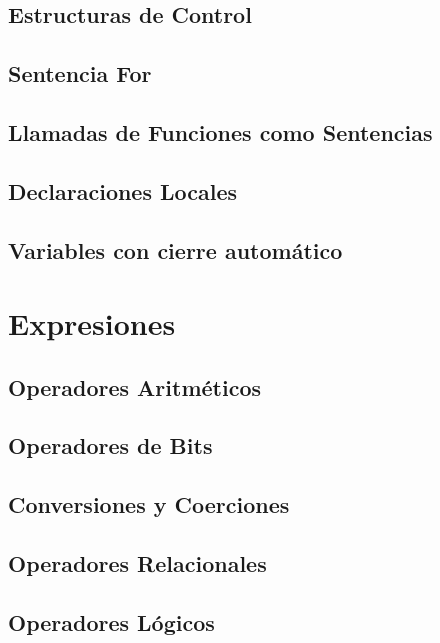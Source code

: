 \subsection{Estructuras de Control}
\lipsum[1]

\subsection{Sentencia For}
\lipsum[1]

\subsection{Llamadas de Funciones como Sentencias}
\lipsum[1]

\subsection{Declaraciones Locales}
\lipsum[1]

\subsection{Variables con cierre automático}
\lipsum[1]


\section{Expresiones}
\lipsum[1-2]

\subsection{Operadores Aritméticos}
\lipsum[1-2]

\subsection{Operadores de Bits}
\lipsum[1-2]

\subsection{Conversiones y Coerciones}
\lipsum[1-2]

\subsection{Operadores Relacionales}
\lipsum[1-2]

\subsection{Operadores Lógicos}
\lipsum[1-2]

